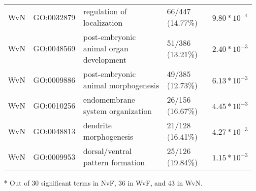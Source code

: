 \documentclass[landscape, 12pt]{article}
\begin{document}
\begin{table}
\begin{threeparttable}
\begin{tabular}{llllr}
  WvN & GO:0032879 & regulation of localization & 66/447 (14.77\%) & $9.80*10^{-4}$ \\ 
  WvN & GO:0048569 & post-embryonic animal organ development & 51/386 (13.21\%) & $2.40*10^{-3}$ \\ 
  WvN & GO:0009886 & post-embryonic animal morphogenesis & 49/385 (12.73\%) & $6.13*10^{-3}$ \\ 
  WvN & GO:0010256 & endomembrane system organization & 26/156 (16.67\%) & $4.45*10^{-3}$ \\ 
  WvN & GO:0048813 & dendrite morphogenesis & 21/128 (16.41\%) & $4.27*10^{-3}$ \\ 
  WvN & GO:0009953 & dorsal/ventral pattern formation & 25/126 (19.84\%) & $1.15*10^{-3}$ \\ 
\hline
\end{tabular}
\begin{tablenotes}
	\item[*] Out of 30 significant terms in NvF, 36 in WvF, and 43 in WvN.
\end{tablenotes}
\end{threeparttable}
\end{table}

\pagebreak
\end{document}
